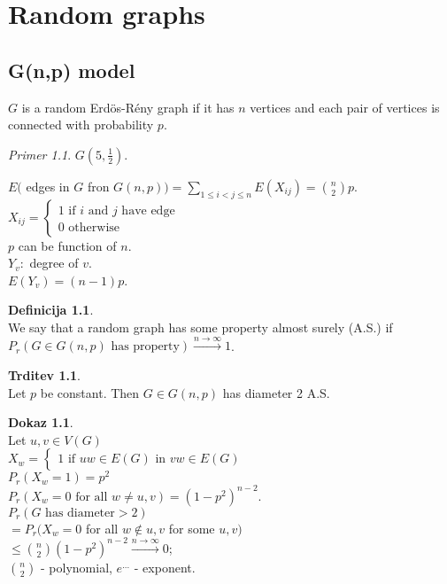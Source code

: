 \documentclass[a4paper, 12pt]{book}
\theoremstyle{definition}
\newtheorem{defn}[counter]{Definicija}
\newtheorem{claim}[counter]{Trditev}
\newtheorem{pro}[counter]{Dokaz}
\theoremstyle{remark}
\newtheorem*{ex}{Primer}
\begin{document}
\chapter{Random graphs}


\section{G(n,p) model}

$G$ is a random Erdös-Rény graph if it has $n$ vertices and each pair of vertices is connected with probability $p$.
\begin{ex}
  $G\left(5, \frac{1}{2}\right)$.
\end{ex}
$E($ edges in $G$ fron $G(n,p)) = \sum_{1 \leq i < j \leq n} E(X_{ij}) = \binom{n}{2} p$. \\
$X_{ij} = \begin{cases}
  1 \text{ if } i \text{ and } j \text{ have edge} \\
  0 \text{ otherwise}
\end{cases}$ \\
$p$ can be function of $n$. \\
$Y_v:$ degree of $v$. \\
$E(Y_v) = (n-1)p$.
\begin{defn} \text{} \\
  We say that a random graph has some property almost surely (A.S.) if
  $P_r(G \in G(n,p) \text{ has property}) \stackrel{n \to \infty}{\to} 1$.
\end{defn}
\begin{claim} \text{} \\
  Let $p$ be constant.
  Then $G \in G(n,p)$ has diameter 2 A.S.
\end{claim}
\begin{pro} \text{} \\
  Let $u,v \in V(G)$ \\
  $X_w = \begin{cases}
    1 \text{ if } uw \in E(G) \text{ in } vw \in E(G)
  \end{cases}$ \\
  $P_r(X_w = 1) = p^2$ \\
  $P_r(X_w = 0 \text{ for all } w \neq u,v) = \left(1-p^2\right)^{n-2}$. \\
  $P_r(G \text{ has diameter} > 2)$ \\
  $= P_r(X_w = 0$ for all $w \notin u,v $ for some $u,v)$ \\
  $\leq \binom{n}{2} (1-p^2)^{n-2} \stackrel{n \to \infty}{\to} 0$; \\
  $\binom{n}{2}$ - polynomial, $e^{...}$ - exponent.
\end{pro}
\end{document}
